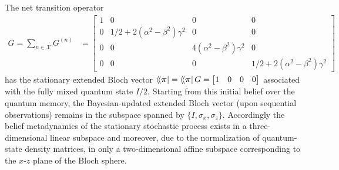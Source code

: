 \documentclass[prx,nofootinbib,onecolumn,showkeys,groupaddress,preprintnumbers,floatfix,
superscriptaddress]{revtex4-1}
\newcommand{\stationary}{\boldsymbol{\pi}}
\newcommand{\dbra}[1]{\bra{ \! \langle #1}}
\begin{document}
The net transition operator 
\begin{align}
G = \sum_{n \in \mathcal{X}} G^{(n)}
&= 
\begin{bmatrix}
    1 & 0 & 0 & 0 \\
    0 & 1/2 + 2 (\alpha^2 - \beta^2)\gamma^2 & 0 & 0 \\
    0 & 0 & 4(\alpha^2 - \beta^2)\gamma^2  & 0 \\
    0 & 0 & 0 & 1/2 + 2(\alpha^2 - \beta^2)\gamma^2 
\end{bmatrix}
\end{align}
has the stationary extended Bloch vector $\dbra{\stationary} = \dbra{\stationary} G = \begin{bmatrix} 1 & 0 & 0 & 0 \end{bmatrix}$ associated with the fully mixed quantum state $I/2$. 
Starting from this initial belief over the quantum memory, the Bayesian-updated extended Bloch vector (upon sequential observations)
remains in the subspace spanned by $\{ I, \sigma_x, \sigma_z \}$.
Accordingly the belief metadynamics of the stationary stochastic process exists in a three-dimensional linear subspace and moreover, due to the normalization of quantum-state density matrices, in only a two-dimensional affine subspace corresponding to the $x$-$z$ plane of the Bloch sphere.

\end{document}
